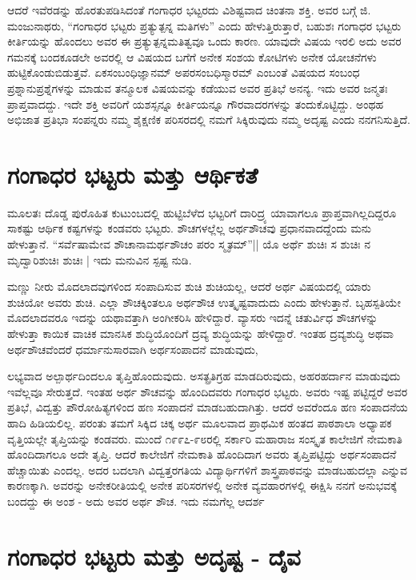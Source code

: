 ಆದರೆ ಇವೆರಡನ್ನು ಹೊರತುಪಡಿಸಿದಂತೆ ಗಂಗಾಧರ ಭಟ್ಟರದು ವಿಶಿಷ್ಟವಾದ ಚಿಂತನಾ ಶಕ್ತಿ. ಅವರ ಬಗ್ಗೆ ಜಿ. ಮಂಜುನಾಥರು, “ಗಂಗಾಧರ ಭಟ್ಟರು ಪ್ರತ್ಯುತ್ಪನ್ನ ಮತಿಗಳು” ಎಂದು ಹೇಳುತ್ತಿರುತ್ತಾರೆ, ಬಹುಶಃ ಗಂಗಾಧರ ಭಟ್ಟರು ಕೀರ್ತಿಯನ್ನು ಹೊಂದಲು ಅವರ ಈ ಪ್ರತ್ಯುತ್ಪನ್ನಮತಿತ್ವವೂ ಒಂದು ಕಾರಣ. ಯಾವುದೇ ವಿಷಯ ಇರಲಿ ಅದು ಅವರ ಗಮನಕ್ಕೆ ಬಂದಕೂಡಲೇ ಅವರಲ್ಲಿ ಆ ವಿಷಯದ ಬಗೆಗೆ ಅನೇಕ ಸಂಶಯ ಕೋಟಿಗಳು ಅನೇಕ ಯೋಚನೆಗಳು ಹುಟ್ಟಿಕೊಂಡುಬಿಡುತ್ತವೆ. ಏಕಸಂಬಂಧಿಜ್ಞಾನಮ್ ಅಪರಸಂಬಧಿಸ್ಮಾರಮ್ ಎಂಬಂತೆ ವಿಷಯದ ಸಂಬಂಧ ಪ್ರಶ್ನಾನುಪ್ರಶ್ನೆಗಳನ್ನು ಮಾಡುವ ತನ್ಮೂಲಕ ವಿಷಯವನ್ನು ಕಡೆಯುವ ಅವರ ಪ್ರತಿಭೆ ಅನನ್ಯ. ಇದು ಅವರ ಜನ್ಮತಃ ಪ್ರಾಪ್ತವಾದದ್ದು. ಇದೇ ಶಕ್ತಿ ಅವರಿಗೆ ಯಶಸ್ಸನ್ನೂ ಕೀರ್ತಿಯನ್ನೂ ಗೌರವಾದರಗಳನ್ನು ತಂದುಕೊಟ್ಟಿದ್ದು. ಅಂಥಹ ಅಭಿಜಾತ ಪ್ರತಿಭಾ ಸಂಪನ್ನರು ನಮ್ಮ ಶೈಕ್ಷಣಿಕ ಪರಿಸರದಲ್ಲಿ ನಮಗೆ ಸಿಕ್ಕಿರುವುದು ನಮ್ಮ ಅದೃಷ್ಟ ಎಂದು ನನಗನಿಸುತ್ತಿದೆ.

\section*{ಗಂಗಾಧರ ಭಟ್ಟರು ಮತ್ತು ಆರ್ಥಿಕತೆ}

ಮೂಲತಃ ದೊಡ್ಡ ಪುರೊಹಿತ ಕುಟುಂಬದಲ್ಲಿ ಹುಟ್ಟಿಬೆಳೆದ ಭಟ್ಟರಿಗೆ ದಾರಿದ್ರ್ಯ ಯಾವಾಗಲೂ ಪ್ರಾಪ್ತವಾಗಿಲ್ಲದಿದ್ದರೂ ಸಾಕಷ್ಟು ಆರ್ಥಿಕ ಕಷ್ಟಗಳನ್ನು ಕಂಡವರು ಭಟ್ಟರು. ಶೌಚಗಳಲ್ಲೆಲ್ಲ ಅರ್ಥಶೌಚವು ಪ್ರಧಾನವಾದದ್ದೆಂದು ಮನು ಹೇಳುತ್ತಾನೆ. “ಸರ್ವೆಷಾಮೇವ ಶೌಚಾನಾಮರ್ಥಶೌಚಂ ಪರಂ ಸ್ಮೃತಮ್”|| ಯೊ ಅರ್ಥೆ ಶುಚಿಃ ಸ ಶುಚಿಃ ನ ಮೃದ್ವಾರಿಶುಚಿಃ ಶುಚಿಃ | ಇದು ಮನುವಿನ ಸ್ಪಷ್ಟ ನುಡಿ. 

ಮಣ್ಣು ನೀರು ಮೊದಲಾದವುಗಳಿಂದ ಸಂಪಾದಿಸುವ ಶುಚಿ ಶುಚಿಯಲ್ಲ, ಆದರೆ ಅರ್ಥ ವಿಷಯದಲ್ಲಿ ಯಾರು ಶುಚಿಯೋ ಅವರು ಶುಚಿ. ಎಲ್ಲಾ ಶೌಚಕ್ಕಿಂತಲೂ ಅರ್ಥಶೌಚ ಉತ್ಕೃಷ್ಟವಾದುದು ಎಂದು ಹೇಳುತ್ತಾನೆ. ಬೃಹಸ್ಪತಿಯೇ ಮೊದಲಾದವರೂ ಇದನ್ನು ಯಥಾವತ್ತಾಗಿ ಅಂಗೀಕರಿಸಿ ಹೇಳಿದ್ದಾರೆ. ವ್ಯಾಸರು ಇದನ್ನೆ ಚತುರ್ವಿಧ ಶೌಚಗಳನ್ನು ಹೇಳುತ್ತಾ ಕಾಯಿಕ ವಾಚಿಕ ಮಾನಸಿಕ ಶುದ್ಧಿಯೊಂದಿಗೆ ದ್ರವ್ಯ ಶುದ್ಧಿಯನ್ನು ಹೇಳಿದ್ದಾರೆ. ಇಂತಹ ದ್ರವ್ಯಶುದ್ಧಿ ಅಥವಾ ಅರ್ಥಶೌಚವೆಂದರೆ ಧರ್ಮಾನುಸಾರವಾಗಿ ಅರ್ಥಸಂಪಾದನೆ ಮಾಡುವುದು,

ಲಭ್ಯವಾದ ಅಲ್ಪಾರ್ಥದಿಂದಲೂ ತೃಪ್ತಿಹೊಂದುವುದು. ಅಸತ್ಪ್ರತಿಗ್ರಹ ಮಾಡದಿರುವುದು, ಅಹರಹರ್ದಾನ ಮಾಡುವುದು ಇವೆಲ್ಲವೂ ಸೇರುತ್ತದೆ. ಇಂತಹ ಅರ್ಥ ಶೌಚವನ್ನು ಹೊಂದಿದವರು ಗಂಗಾಧರ ಭಟ್ಟರು. ಅವರು ಇಷ್ಟ ಪಟ್ಟಿದ್ದರೆ ಅವರ ಪ್ರತಿಭೆ, ವಿದ್ವತ್ತು ಪೌರೋಹಿತ್ಯಗಳಿಂದ ಹಣ ಸಂಪಾದನೆ ಮಾಡಬಹುದಾಗಿತ್ತು. ಆದರೆ ಅವರೆಂದೂ ಹಣ ಸಂಪಾದನೆಯ ಹಾದಿ ಹಿಡಿಯಲಿಲ್ಲ. ಪರಂತು ತಮಗೆ ಸಿಕ್ಕಿದ ಚಿಕ್ಕ ಅರ್ಥ ಮೂಲವಾದ ಪ್ರಾಥಮಿಕ ಹಂತದ ಪಾಠಶಾಲಾ ಅಧ್ಯಾಪಕ ವೃತ್ತಿಯಲ್ಲೇ ತೃಪ್ತಿಯನ್ನು ಕಂಡವರು. ಮುಂದೆ ೧೯೯೭-೯೮ರಲ್ಲಿ ಸರ್ಕಾರಿ ಮಹಾರಾಜ ಸಂಸ್ಕೃತ ಕಾಲೇಜಿಗೆ ನೇಮಕಾತಿ ಹೊಂದಿದಾಗಲೂ ಅದೇ ತೃಪ್ತಿ. ಆದರೆ ಕಾಲೇಜಿಗೆ ನೇಮಕಾತಿ ಹೊಂದಿದಾಗ ಅವರು ತೃಪ್ತಿಪಟ್ಟಿದ್ದು ಅರ್ಥಸಂಪಾದನೆ ಹೆಚ್ಚಾಯಿತು ಎಂದಲ್ಲ. ಅದರ ಬದಲಾಗಿ ವಿದ್ವತ್ತರಗತಿಯ ವಿದ್ಯಾರ್ಥಿಗಳಿಗೆ ಶಾಸ್ತ್ರಪಾಠವನ್ನು ಮಾಡಬಹುದಲ್ಲಾ ಎನ್ನುವ ಕಾರಣಕ್ಕಾಗಿ. ಅವರನ್ನು ಅನೇಕರೀತಿಯಲ್ಲಿ ಅನೇಕ ಪರಿಸರಗಳಲ್ಲಿ ಅನೇಕ ವ್ಯವಹಾರಗಳಲ್ಲಿ ಈಕ್ಷಿಸಿ ನನಗೆ ಅನುಭವಕ್ಕೆ ಬಂದದ್ದು ಈ ಅಂಶ - ಅದು ಅವರ ಅರ್ಥ ಶೌಚ. ಇದು ನಮಗೆಲ್ಲ ಆದರ್ಶ 

\section*{ಗಂಗಾಧರ ಭಟ್ಟರು ಮತ್ತು ಅದೃಷ್ಟ - ದೈವ}

